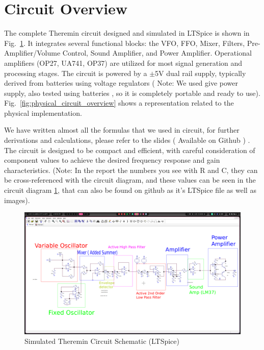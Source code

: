 \documentclass[conference]{IEEEtran}
\begin{document}
\section{Circuit Overview}
The complete Theremin circuit designed and simulated in LTSpice is shown in Fig.~\ref{fig:circuit_overview}. It integrates several functional blocks: the VFO, FFO, Mixer, Filters, Pre-Amplifier/Volume Control, Sound Amplifier, and Power Amplifier. Operational amplifiers (OP27, UA741, OP37) are utilized for most signal generation and processing stages. The circuit is powered by a $\pm$5V dual rail supply, typically derived from batteries using voltage regulators ( Note: We used give power supply, also tested using batteries , so it is completely portable and ready to use). Fig.~\ref{fig:physical_circuit_overview} shows a representation related to the physical implementation.

We have written almost all the formulas that we used in circuit, for further derivations and calculations, please refer to the slides ( Available on Github ) \cite{Github} . The circuit is designed to be compact and efficient, with careful consideration of component values to achieve the desired frequency response and gain characteristics. (Note: In the report the numbers you see with R and C, they can be cross-referenced with the circuit diagram, and these values can be seen in the circuit diagram \ref{fig:circuit_overview}, that can also be found on github as it's LTSpice file as well as images).

\begin{figure}[htbp]
    \centering
    \includegraphics[width=0.95\linewidth]{theremin_circuit.png} %
    \caption{Simulated Theremin Circuit Schematic (LTSpice)}
    \label{fig:circuit_overview}
\end{figure}
\end{document}
